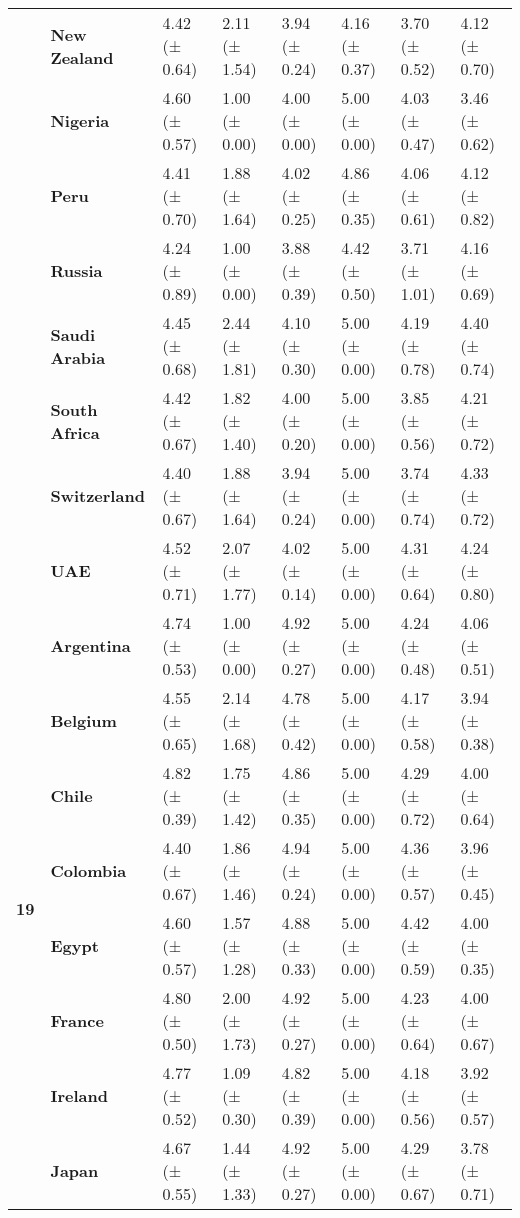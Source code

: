 \begin{tabular}{llllllll}
\textbf{} & \textbf{New Zealand} & 4.42 (± 0.64) & 2.11 (± 1.54) & 3.94 (± 0.24) & 4.16 (± 0.37) & 3.70 (± 0.52) & 4.12 (± 0.70) \\
\textbf{} & \textbf{Nigeria} & 4.60 (± 0.57) & 1.00 (± 0.00) & 4.00 (± 0.00) & 5.00 (± 0.00) & 4.03 (± 0.47) & 3.46 (± 0.62) \\
\textbf{} & \textbf{Peru} & 4.41 (± 0.70) & 1.88 (± 1.64) & 4.02 (± 0.25) & 4.86 (± 0.35) & 4.06 (± 0.61) & 4.12 (± 0.82) \\
\textbf{} & \textbf{Russia} & 4.24 (± 0.89) & 1.00 (± 0.00) & 3.88 (± 0.39) & 4.42 (± 0.50) & 3.71 (± 1.01) & 4.16 (± 0.69) \\
\textbf{} & \textbf{Saudi Arabia} & 4.45 (± 0.68) & 2.44 (± 1.81) & 4.10 (± 0.30) & 5.00 (± 0.00) & 4.19 (± 0.78) & 4.40 (± 0.74) \\
\textbf{} & \textbf{South Africa} & 4.42 (± 0.67) & 1.82 (± 1.40) & 4.00 (± 0.20) & 5.00 (± 0.00) & 3.85 (± 0.56) & 4.21 (± 0.72) \\
\textbf{} & \textbf{Switzerland} & 4.40 (± 0.67) & 1.88 (± 1.64) & 3.94 (± 0.24) & 5.00 (± 0.00) & 3.74 (± 0.74) & 4.33 (± 0.72) \\
\textbf{} & \textbf{UAE} & 4.52 (± 0.71) & 2.07 (± 1.77) & 4.02 (± 0.14) & 5.00 (± 0.00) & 4.31 (± 0.64) & 4.24 (± 0.80) \\
\cline{1-8}
\multirow[t]{19}{*}{\textbf{19}} & \textbf{Argentina} & 4.74 (± 0.53) & 1.00 (± 0.00) & 4.92 (± 0.27) & 5.00 (± 0.00) & 4.24 (± 0.48) & 4.06 (± 0.51) \\
\textbf{} & \textbf{Belgium} & 4.55 (± 0.65) & 2.14 (± 1.68) & 4.78 (± 0.42) & 5.00 (± 0.00) & 4.17 (± 0.58) & 3.94 (± 0.38) \\
\textbf{} & \textbf{Chile} & 4.82 (± 0.39) & 1.75 (± 1.42) & 4.86 (± 0.35) & 5.00 (± 0.00) & 4.29 (± 0.72) & 4.00 (± 0.64) \\
\textbf{} & \textbf{Colombia} & 4.40 (± 0.67) & 1.86 (± 1.46) & 4.94 (± 0.24) & 5.00 (± 0.00) & 4.36 (± 0.57) & 3.96 (± 0.45) \\
\textbf{} & \textbf{Egypt} & 4.60 (± 0.57) & 1.57 (± 1.28) & 4.88 (± 0.33) & 5.00 (± 0.00) & 4.42 (± 0.59) & 4.00 (± 0.35) \\
\textbf{} & \textbf{France} & 4.80 (± 0.50) & 2.00 (± 1.73) & 4.92 (± 0.27) & 5.00 (± 0.00) & 4.23 (± 0.64) & 4.00 (± 0.67) \\
\textbf{} & \textbf{Ireland} & 4.77 (± 0.52) & 1.09 (± 0.30) & 4.82 (± 0.39) & 5.00 (± 0.00) & 4.18 (± 0.56) & 3.92 (± 0.57) \\
\textbf{} & \textbf{Japan} & 4.67 (± 0.55) & 1.44 (± 1.33) & 4.92 (± 0.27) & 5.00 (± 0.00) & 4.29 (± 0.67) & 3.78 (± 0.71) \\

\end{tabular}

